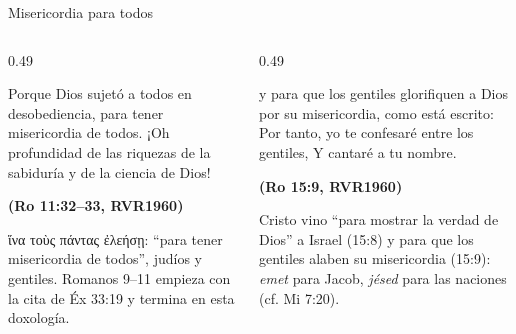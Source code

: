 \documentclass[hyperref={bookmarks=false},aspectratio=169]{beamer}
\newcommand{\grc}[1]{\foreignlanguage{ancientgreek}{#1}}
\newcommand{\fuente}[1]{\par\hfill{\upshape\bfseries\footnotesize\textcolor{azul}{#1}}}
\begin{document}
\begin{frame}{Misericordia para todos}
\begin{columns}[t,onlytextwidth]
\begin{column}{0.49\textwidth}
\begin{cita}Porque Dios sujetó a todos en desobediencia, para tener misericordia de todos. ¡Oh profundidad de las riquezas de la sabiduría y de la ciencia de Dios!\fuente{(Ro 11:32--33, RVR1960)}\end{cita}
\scriptsize\grc{ἵνα τοὺς πάντας ἐλεήσῃ}: ``para tener misericordia de todos'', judíos y gentiles. Romanos 9--11 empieza con la cita de Éx 33:19 y termina en esta doxología.
\end{column}
\begin{column}{0.49\textwidth}
\begin{cita}y para que los gentiles glorifiquen a Dios por su misericordia, como está escrito: Por tanto, yo te confesaré entre los gentiles, Y cantaré a tu nombre.\fuente{(Ro 15:9, RVR1960)}\end{cita}
\scriptsize Cristo vino ``para mostrar la verdad de Dios'' a Israel (15:8) y para que los gentiles alaben su misericordia (15:9): \emph{emet} para Jacob, \emph{jésed} para las naciones (cf. Mi 7:20).
\end{column}
\end{columns}\par\smallskip
\centering
{}
\end{frame}
\end{document}
